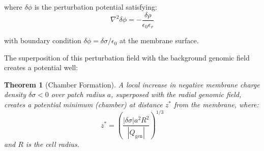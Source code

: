 \documentclass[twocolumn,10pt,aps,prd,superscriptaddress,floatfix,nofootinbib]{revtex4-2}
\newtheorem{theorem}{Theorem}[section]
\theoremstyle{remark}
\newcommand{\Qgen}{Q_{\mathrm{gen}}}
\begin{document}
where $\delta\phi$ is the perturbation potential satisfying:
\begin{equation}
\nabla^2 \delta\phi = -\frac{\delta\rho}{\epsilon_0\epsilon_r}
\end{equation}

with boundary condition $\delta\phi = \delta\sigma/\epsilon_0$ at the membrane surface.

The superposition of this perturbation field with the background genomic field creates a potential well:

\begin{theorem}[Chamber Formation]
\label{thm:chamber_formation}
A local increase in negative membrane charge density $\delta\sigma < 0$ over patch radius $a$, superposed with the radial genomic field, creates a potential minimum (chamber) at distance $z^*$ from the membrane, where:
\begin{equation}
z^* = \left(\frac{|\delta\sigma| a^2 R^2}{|\Qgen|}\right)^{1/3}
\label{eq:chamber_distance}
\end{equation}
and $R$ is the cell radius.
\end{theorem}
\end{document}
